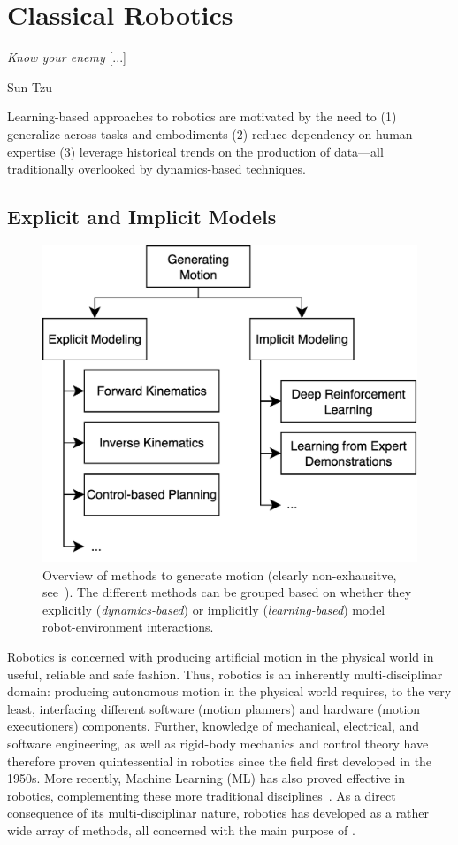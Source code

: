\section{Classical Robotics}
\label{sec:classical}

\epigraph{\textit{Know your enemy} [...]}{Sun Tzu}

\begin{tldr}
Learning-based approaches to robotics are motivated by the need to (1) generalize across tasks and embodiments (2) reduce dependency on human expertise (3) leverage historical trends on the production of data---all traditionally overlooked by dynamics-based techniques.
\end{tldr}

\subsection{Explicit and Implicit Models}

\begin{figure}
    \centering
    \includegraphics[width=0.5\linewidth]{figures/ch2/ch2-approaches.png}
    \caption{Overview of methods to generate motion (clearly non-exhausitve, see~\citet{bekrisStateRobotMotion2024}). The different methods can be grouped based on whether they explicitly (\emph{dynamics-based}) or implicitly (\emph{learning-based}) model robot-environment interactions.}
    \label{fig:generating-motion-atlas}
\end{figure}

Robotics is concerned with producing artificial motion in the physical world in useful, reliable and safe fashion.
Thus, robotics is an inherently multi-disciplinar domain: producing autonomous motion in the physical world requires, to the very least, interfacing different software (motion planners) and hardware (motion executioners) components.
Further, knowledge of mechanical, electrical, and software engineering, as well as rigid-body mechanics and control theory have therefore proven quintessential in robotics since the field first developed in the 1950s.
More recently, Machine Learning (ML) has also proved effective in robotics, complementing these more traditional disciplines~\citep{connellRobotLearning1993}.
As a direct consequence of its multi-disciplinar nature, robotics has developed as a rather wide array of methods, all concerned with the main purpose of .

